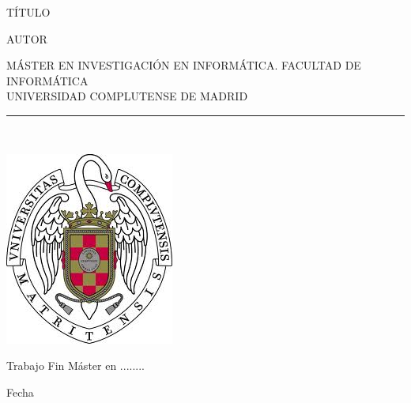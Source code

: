 \begin{center}

   \vspace{1cm}


   {\Large TÍTULO}\\

   \vspace{0.5cm}



   \vspace{0.5cm}



   {\large AUTOR}\\

   \vspace{0.5cm}




   MÁSTER EN INVESTIGACIÓN EN INFORMÁTICA. FACULTAD DE INFORMÁTICA\\
   UNIVERSIDAD COMPLUTENSE DE MADRID \\


   \vspace{0.65cm}
   \rule{2in}{0.5pt}\\
   \vspace{0.85cm}

  \includegraphics[height=2.5in]{figures/escudo.jpg}
  

   \vspace{0.5cm}
Trabajo Fin Máster en  ........

   \vspace{0.5cm}






  Fecha\\
   \vspace{1cm}

\end{center}


